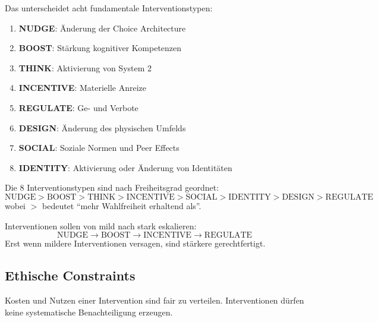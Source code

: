 \begin{axiom}
Das \BCM{} unterscheidet acht fundamentale Interventionstypen:
\begin{enumerate}
    \item \textbf{NUDGE}: Änderung der Choice Architecture
    \item \textbf{BOOST}: Stärkung kognitiver Kompetenzen
    \item \textbf{THINK}: Aktivierung von System 2
    \item \textbf{INCENTIVE}: Materielle Anreize
    \item \textbf{REGULATE}: Ge- und Verbote
    \item \textbf{DESIGN}: Änderung des physischen Umfelds
    \item \textbf{SOCIAL}: Soziale Normen und Peer Effects
    \item \textbf{IDENTITY}: Aktivierung oder Änderung von Identitäten
\end{enumerate}
\end{axiom}

\begin{axiom}
Die 8 Interventionstypen sind nach Freiheitsgrad geordnet:
\begin{equation}
\text{NUDGE} > \text{BOOST} > \text{THINK} > \text{INCENTIVE} > \text{SOCIAL} > \text{IDENTITY} > \text{DESIGN} > \text{REGULATE}
\end{equation}
wobei $>$ bedeutet ``mehr Wahlfreiheit erhaltend als''.
\end{axiom}

\begin{axiom}
Interventionen sollen von mild nach stark eskalieren:
\begin{equation}
\text{NUDGE} \rightarrow \text{BOOST} \rightarrow \text{INCENTIVE} \rightarrow \text{REGULATE}
\end{equation}
Erst wenn mildere Interventionen versagen, sind stärkere gerechtfertigt.
\end{axiom}

\subsection{Ethische Constraints}

\begin{axiom}
Kosten und Nutzen einer Intervention sind fair zu verteilen. Interventionen dürfen keine systematische Benachteiligung erzeugen.
\end{axiom}

